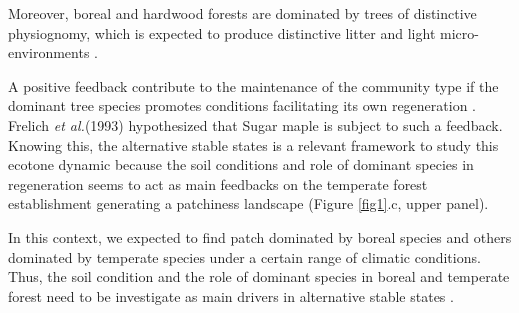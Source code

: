 
Moreover, boreal and hardwood forests are dominated by trees of distinctive
physiognomy, which is expected to produce distinctive litter and light
micro-environments \cite{Barras1998}.

A positive feedback contribute to the maintenance of the community type if the
dominant tree species promotes conditions facilitating its own regeneration
\cite{Barras1998}. Frelich \textit{et al.}(1993) \cite{Society2014}
hypothesized that Sugar maple is subject to such a feedback.  Knowing this,
the alternative stable states is a relevant framework to study this ecotone
dynamic because the soil conditions and role of dominant species in
regeneration seems to act as main feedbacks on the temperate forest
establishment generating a patchiness landscape (Figure \ref{fig1}.c, upper
panel).


In this context, we expected to find patch dominated by boreal species and
others dominated by temperate species under a certain range of climatic
conditions. Thus, the soil condition and the role of dominant species in
boreal and temperate forest need to be investigate as main drivers in
alternative stable states
\cite{Kellman2004,Moore2008,DeFrenne2013,Barras1998}.



